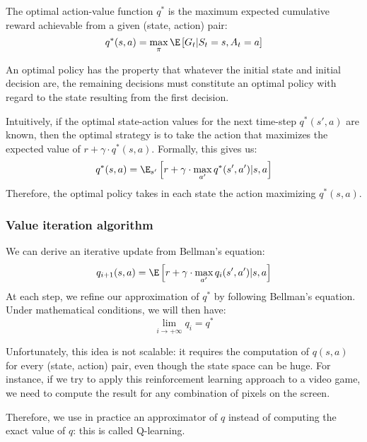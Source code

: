 \begin{definition}
    The optimal action-value function $q^*$ is the maximum expected cumulative reward achievable from a given (state, action) pair:
    \begin{equation*}
        q^*(s,a) = \max_\pi\E\left[G_t|S_t=s,A_t=a\right]
    \end{equation*}
\end{definition}

\begin{theorem}
    An optimal policy has the property that whatever the initial state and initial decision are, the remaining decisions must constitute an optimal policy with regard to the state resulting from the first decision.
\end{theorem}

\begin{property}
    Intuitively, if the optimal state-action values for the next time-step $q^*(s',a)$ are known, then the optimal strategy is to take the action that maximizes the expected value of $r+ \gamma\cdot q^*(s, a)$. Formally, this gives us:
    \begin{equation}
        q^*(s,a) = \E_{s'}\left[r+\gamma\cdot\max_{a'}q^*(s',a')|s,a\right]
    \end{equation}
    Therefore, the optimal policy takes in each state the action maximizing $q^*(s,a)$.
\end{property}

\subsubsection{Value iteration algorithm}
We can derive an iterative update from Bellman's equation:
\begin{equation*}
    q_{i+1}(s,a) = \E\left[r+\gamma\cdot\max_{a'}q_i(s',a')|s,a\right]
\end{equation*}
At each step, we refine our approximation of $q^*$ by following Bellman's equation. Under mathematical conditions, we will then have:
\begin{equation*}
    \lim_{i\to+\infty}q_i = q^*
\end{equation*}

Unfortunately, this idea is not scalable: it requires the computation of $q(s,a)$ for every (state, action) pair, even though the state space can be huge. For instance, if we try to apply this reinforcement learning approach to a video game, we need to compute the result for any combination of pixels on the screen.

Therefore, we use in practice an approximator of $q$ instead of computing the exact value of $q$: this is called Q-learning. 